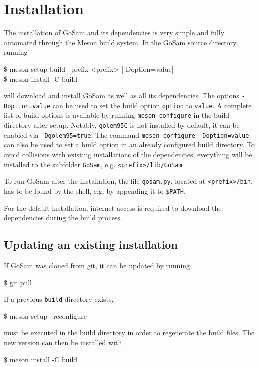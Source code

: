 \documentclass[11pt,a4paper]{refrep}
\newcommand{\gosam}{{\sc GoSam}\xspace}
\newcommand{\golemVC}{{\tt golem95C}\xspace}
\begin{document}
\section{Installation}

The installation of \gosam and its dependencies is very simple and fully automated through the Meson
build system. In the \gosam source directory, running
\begin{example}
\$ meson setup build --prefix <prefix> [-Doption=value] \\
\$ meson install -C build
\end{example}
will download and install \gosam as well as all its dependencies. The options {\tt -Doption=value} can
be used to set the build option {\tt option} to {\tt value}. A complete list of build options is available by
running {\tt meson configure} in the build directory after
setup. Notably, \golemVC is not installed by default, it can be
enabled via \texttt{-Dgolem95=true}. The command {\tt meson configure -Doption=value} can also
be used to set a build option in an already configured build directory. To avoid collisions with existing
installations of the dependencies, everything will be installed to the subfolder {\tt GoSam},
e.g. {\tt <prefix>/lib/GoSam}.

To run \gosam after the installation, the file \texttt{gosam.py}, located at \texttt{<prefix>/bin}, has to be found by the shell, e.g. by appending it to \texttt{\$PATH}.

For the default installation, internet access is required to download the dependencies during the build process.

\subsection{Updating an existing installation}

If \gosam was cloned from git, it can be updated by running
\begin{example}
\$ git pull
\end{example}
If a previous \texttt{build} directory exists, 
\begin{example}
\$ meson setup --reconfigure
\end{example}
must be executed in the build directory in order to regenerate the build files. The new version can then be installed with 
\begin{example}
\$ meson install -C build
\end{example}
\end{document}
